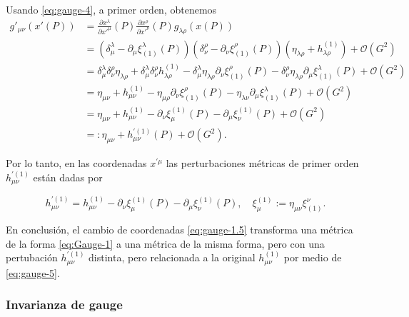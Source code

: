 \documentclass[letterpaper,11pt]{article}
\begin{document}
Usando \eqref{eq:gauge-4}, a primer orden, obtenemos
\begin{align}
g'_{\mu\nu}(x'(P)) &= \frac{\partial x^{\lambda}}{\partial x'^{\mu}}(P)\frac{\partial x^{\rho}}{\partial x'^{\nu}}(P) g_{\lambda\rho}(x(P)) \nonumber \\
&=  \left( \delta_{\mu}^{\lambda} - \partial_{\mu}\xi_{(1)}^{\lambda}(P) \right) \left( \delta_{\nu}^{\rho} - \partial_{\nu}\xi_{(1)}^{\rho}(P) \right) \left(\eta_{\lambda\rho} + h_{\lambda\rho}^{(1)}\right) + \mathcal{O}(G^2) \nonumber \\
&= \delta_{\mu}^{\lambda} \delta_{\nu}^{\rho} \eta_{\lambda\rho} + \delta_{\mu}^{\lambda} \delta_{\nu}^{\rho} h_{\lambda\rho}^{(1)}   - \delta_{\mu}^{\lambda} \eta_{\lambda\rho} \partial_{\nu}\xi_{(1)}^{\rho}(P) - \delta_{\nu}^{\rho} \eta_{\lambda\rho} \partial_{\mu} \xi_{(1)}^{\lambda}(P) +  \mathcal{O}(G^2) \nonumber \\
&= \eta_{\mu\nu} + h_{\mu\nu}^{(1)} - \eta_{\mu\rho} \partial_{\nu} \xi_{(1)}^{\rho}(P) - \eta_{\lambda\nu} \partial_{\mu} \xi^{\lambda}_{(1)}(P) + \mathcal{O}(G^2) \nonumber \\
&= \eta_{\mu\nu} + h_{\mu\nu}^{(1)} - \partial_{\nu} \xi^{(1)}_{\mu}(P) -  \partial_{\mu} \xi_{\nu}^{(1)}(P) + \mathcal{O}(G^2) \nonumber \\
&=: \eta_{\mu\nu} + h_{\mu\nu}^{'(1)}(P) + \mathcal{O}(G^2).
\end{align}

Por lo tanto, en las coordenadas $x^{'\mu}$ las perturbaciones métricas de primer orden $h_{\mu\nu}^{'(1)}$ están dadas por
\begin{shaded}
\begin{equation}
h_{\mu\nu}^{'(1)} =  h_{\mu\nu}^{(1)} - \partial_{\nu} \xi^{(1)}_{\mu}(P) -  \partial_{\mu} \xi_{\nu}^{(1)}(P), \quad \xi_{\mu}^{(1)} := \eta_{\mu\nu} \xi_{(1)}^{\nu}. \label{eq:gauge-5}
\end{equation}
\end{shaded}

En conclusión, el cambio de coordenadas \eqref{eq:gauge-1.5} transforma una métrica de la forma \eqref{eq:Gauge-1} a una métrica de la misma forma, pero con una pertubación $h_{\mu\nu}^{'(1)}$ distinta, pero relacionada a la original $h^{(1)}_{\mu\nu}$ por medio de \eqref{eq:gauge-5}.

\subsubsection{Invarianza de gauge}
\end{document}

